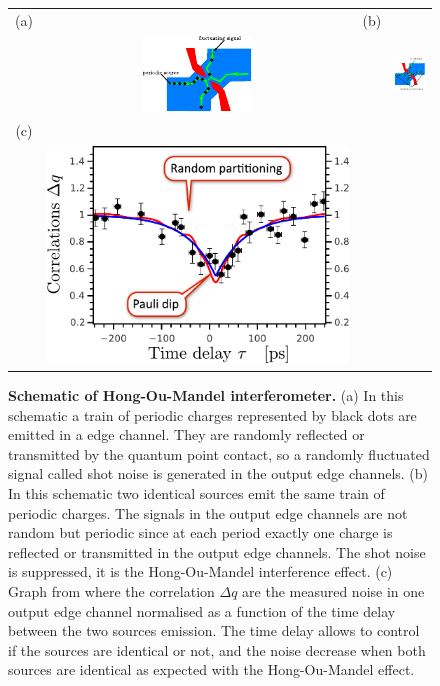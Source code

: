 \begin{figure}[hptb]
	\begin{center}
		\begin{tabular}{c c c c}
			(a) & & (b) & \\
			& \includegraphics[height = 4 cm]{./intro/hom_shot_noise}
			& &
			\includegraphics[height = 4 cm]{./intro/hom_noise_reduction} \\
			(c) & &  & \\
			& \includegraphics[width = 4 cm]{./intro/hom_measure}
			& &
			
		\end{tabular}
	\end{center}
	
	\caption{\textbf{Schematic of Hong-Ou-Mandel interferometer.} (a) In this schematic a train of periodic charges represented by black dots are emitted in a edge channel. They are randomly reflected or transmitted by the quantum point contact, so a randomly fluctuated signal called shot noise is generated in the output edge channels. (b) In this schematic two identical sources emit the same train of periodic charges. The signals in the output edge channels are not random but periodic since at each period  exactly one charge is reflected or transmitted in the output edge channels. The shot noise is suppressed, it is the Hong-Ou-Mandel interference effect. (c) Graph from \cite{bocquillon2013} where the correlation $\Delta q$ are the measured noise in one output edge channel normalised as a function of the time delay between the two sources emission. The time delay allows to control if the sources are identical or not, and the noise decrease when both sources are identical as expected with the Hong-Ou-Mandel effect.}
	\label{fig: hom}
\end{figure}

